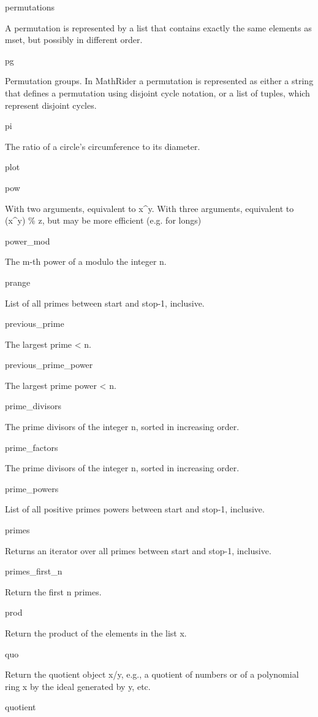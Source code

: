 \documentclass[12pt,oneside]{book}
\begin{document}
permutations

A permutation is represented by a list that contains exactly the same elements as mset, but possibly in different order.

pg

Permutation groups. In MathRider a permutation is represented as either a string that defines a permutation using disjoint cycle notation, or a list of tuples, which represent disjoint cycles.

pi

The ratio of a circle's circumference to its diameter.

plot


pow

With two arguments, equivalent to x\^{}y. With three arguments, equivalent to (x\^{}y) \% z, but may be more efficient (e.g. for longs)

power\_mod

The m{}-th power of a modulo the integer n.

prange

List of all primes between start and stop{}-1, inclusive.

previous\_prime

The largest prime {\textless} n.

previous\_prime\_power

The largest prime power {\textless} n.

prime\_divisors

The prime divisors of the integer n, sorted in increasing order.

prime\_factors

The prime divisors of the integer n, sorted in increasing order.

prime\_powers

List of all positive primes powers between start and stop{}-1, inclusive.

primes

Returns an iterator over all primes between start and stop{}-1, inclusive.

primes\_first\_n

Return the first n primes.

prod

Return the product of the elements in the list x.

quo

Return the quotient object x/y, e.g., a quotient of numbers or of a polynomial ring x by the ideal generated by y, etc.

quotient
\end{document}
